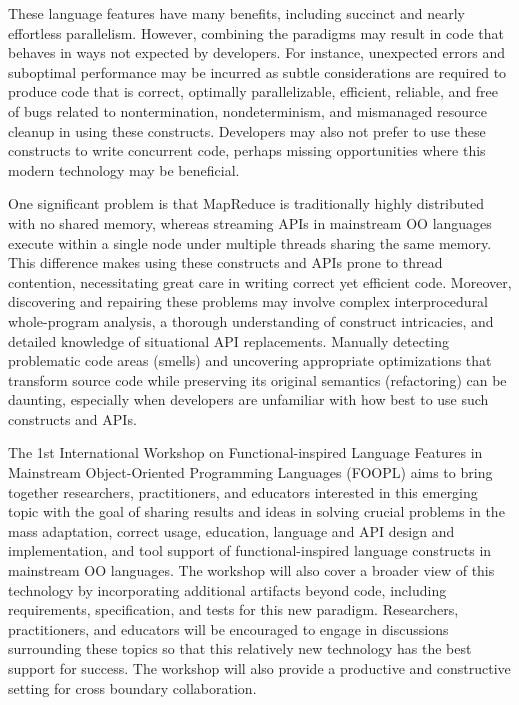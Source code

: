 \documentclass[10pt, conference]{IEEEtran}
\begin{document}
These language features have many benefits, including succinct and nearly effortless
parallelism. However, combining the paradigms may result in code that behaves in ways not expected by developers. For instance, unexpected errors and suboptimal performance may be incurred as subtle considerations are required to produce code that is correct, optimally parallelizable, efficient, reliable, and free of bugs related to nontermination, nondeterminism, and mismanaged resource cleanup in using these constructs. Developers may also not prefer to use these constructs to write concurrent code, perhaps missing opportunities where this modern technology may be beneficial.

One significant problem is that MapReduce is traditionally highly distributed with no shared memory, whereas streaming APIs in mainstream OO languages execute within a single node under multiple threads sharing the same memory. This difference makes using these constructs and APIs prone to 
thread contention, necessitating great care in writing correct yet efficient code. Moreover, discovering and repairing these problems may involve complex interprocedural whole-program analysis, a thorough understanding of construct intricacies, and detailed knowledge of situational API replacements. Manually detecting problematic code areas (smells) and uncovering appropriate optimizations that transform source code while preserving its original semantics (refactoring) can be daunting, especially
when developers are unfamiliar with how best to use such constructs and APIs.

The 1st International Workshop on Functional-inspired Language Features in Mainstream Object-Oriented Programming Languages (FOOPL) aims to bring together researchers, practitioners, and educators interested in this emerging topic with the goal of sharing results and ideas in solving crucial problems in the mass adaptation, correct usage, education, language and API design and implementation, and tool support of functional-inspired language constructs in mainstream OO languages. The workshop will also cover a broader view of this technology by incorporating additional artifacts beyond code, including requirements, specification, and tests for this new paradigm. Researchers, practitioners, and educators will be encouraged to engage in
discussions surrounding these topics so that this relatively new technology has the best support for success. The workshop will also provide a productive and constructive setting for cross boundary collaboration.
\end{document}

